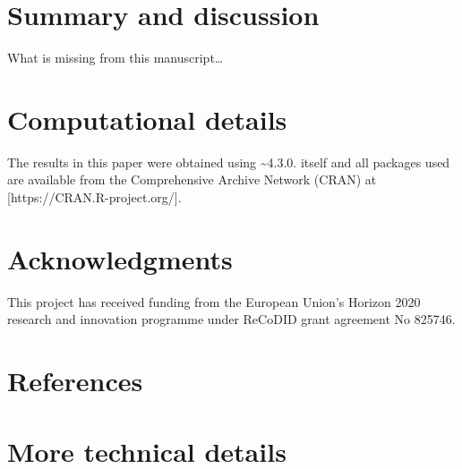 \documentclass[
  article]{jss}
\begin{document}
\hypertarget{sec-summary}{%
\section{Summary and discussion}\label{sec-summary}}

What is missing from this manuscript\ldots{}

\hypertarget{computational-details}{%
\section*{Computational details}\label{computational-details}}

The results in this paper were obtained using
\textasciitilde4.3.0.  itself and all packages
used are available from the Comprehensive  Archive Network
(CRAN) at {[}https://CRAN.R-project.org/{]}.

\hypertarget{acknowledgments}{%
\section*{Acknowledgments}\label{acknowledgments}}

This project has received funding from the European Union's Horizon 2020
research and innovation programme under ReCoDID grant agreement No
825746.

\hypertarget{references}{%
\section*{References}\label{references}}

\renewcommand{\bibsection}{}


\newpage{}

\hypertarget{sec-techdetails}{%
\section*{More technical details}\label{sec-techdetails}}
\end{document}
